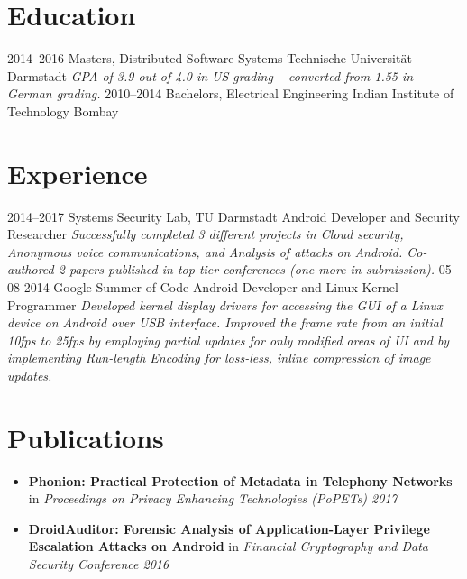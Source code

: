 \documentclass[]{friggeri-cv}
\begin{document}
\section{Education}
\begin{entrylist}
  \entry
    {2014–2016}
    {Masters, {\normalfont Distributed Software Systems}}
    {Technische Universität Darmstadt}
    {\emph{GPA of 3.9 out of 4.0 in US grading -- converted from 1.55 in German grading.}}
  \entry
    {2010–2014}
    {Bachelors, {\normalfont Electrical Engineering}}
    {Indian Institute of Technology Bombay}
    {}%
\end{entrylist}

\section{Experience}
\begin{entrylist}
  \entry
    {2014–2017}
    {Systems Security Lab, TU Darmstadt}
    {Android Developer and Security Researcher}
    {\emph{Successfully completed 3 different projects in Cloud security, Anonymous voice communications, and Analysis of attacks on Android. Co-authored 2 papers published in top tier conferences (one more in submission).}}
  \entry
    {05–08 2014}
    {Google Summer of Code}
    {Android Developer and Linux Kernel Programmer}
    {\emph{Developed kernel display drivers for accessing the GUI of a Linux device on Android over USB interface. Improved the frame rate from an initial 10fps to 25fps by employing partial updates for only modified areas of UI and by implementing Run-length Encoding for loss-less, inline compression of image updates.}}
\end{entrylist}

\section{Publications}
\begin{itemize}
  \item \textbf{Phonion: Practical Protection of Metadata in Telephony Networks} in \textit{Proceedings on Privacy Enhancing Technologies (PoPETs) 2017}
  \item \textbf{DroidAuditor: Forensic Analysis of Application-Layer Privilege Escalation Attacks on Android} in \textit{Financial Cryptography and Data Security Conference 2016}
\end{itemize}
\vspace{0.3cm}
\end{document}
